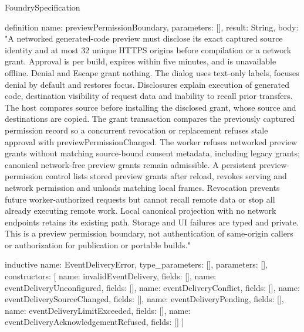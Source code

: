 \begin{lexlean}{FoundrySpecification}
\begin{semanticmodule}
definition{
  name: previewPermissionBoundary,
  parameters: [],
  result: String,
  body: "A networked generated-code preview must disclose its exact captured source identity and at most 32 unique HTTPS origins before compilation or a network grant. Approval is per build, expires within five minutes, and is unavailable offline. Denial and Escape grant nothing. The dialog uses text-only labels, focuses denial by default and restores focus. Disclosures explain execution of generated code, destination visibility of request data and inability to recall prior transfers. The host compares source before installing the disclosed grant, whose source and destinations are copied. The grant transaction compares the previously captured permission record so a concurrent revocation or replacement refuses stale approval with previewPermissionChanged. The worker refuses networked preview grants without matching source-bound consent metadata, including legacy grants; canonical network-free preview grants remain admissible. A persistent preview-permission control lists stored preview grants after reload, revokes serving and network permission and unloads matching local frames. Revocation prevents future worker-authorized requests but cannot recall remote data or stop all already executing remote work. Local canonical projection with no network endpoints retains its existing path. Storage and UI failures are typed and private. This is a preview permission boundary, not authentication of same-origin callers or authorization for publication or portable builds."
}

inductive{
  name: EventDeliveryError,
  type_parameters: [],
  parameters: [],
  constructors: [
    {name: invalidEventDelivery, fields: []},
    {name: eventDeliveryUnconfigured, fields: []},
    {name: eventDeliveryConflict, fields: []},
    {name: eventDeliverySourceChanged, fields: []},
    {name: eventDeliveryPending, fields: []},
    {name: eventDeliveryLimitExceeded, fields: []},
    {name: eventDeliveryAcknowledgementRefused, fields: []}
  ]
}


\end{semanticmodule}
\end{lexlean}
